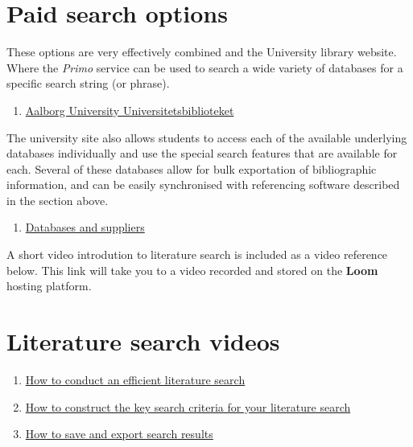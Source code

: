 \documentclass[
]{book}
\providecommand{\tightlist}{%
  \setlength{\itemsep}{0pt}\setlength{\parskip}{0pt}}
\begin{document}
\hypertarget{paid-search-options}{%
\section{Paid search options}\label{paid-search-options}}

These options are very effectively combined and the University library website. Where the \emph{Primo} service can be used to search a wide variety of databases for a specific search string (or phrase).

\begin{enumerate}
\def\labelenumi{\arabic{enumi}.}
\tightlist
\item
  \href{https://www.en.aub.aau.dk}{Aalborg University Universitetsbiblioteket}
\end{enumerate}

The university site also allows students to access each of the available underlying databases individually and use the special search features that are available for each. Several of these databases allow for bulk exportation of bibliographic information, and can be easily synchronised with referencing software described in the section above.

\begin{enumerate}
\def\labelenumi{\arabic{enumi}.}
\setcounter{enumi}{1}
\tightlist
\item
  \href{https://www.en.aub.aau.dk/find-material/databases}{Databases and suppliers}
\end{enumerate}

A short video introdution to literature search is included as a video reference below. This link will take you to a video recorded and stored on the \textbf{Loom} hosting platform.

\hypertarget{literature-search-videos}{%
\section{Literature search videos}\label{literature-search-videos}}

\begin{enumerate}
\def\labelenumi{\arabic{enumi}.}
\item
  \href{}{How to conduct an efficient literature search}
\item
  \href{}{How to construct the key search criteria for your literature search}
\item
  \href{}{How to save and export search results}
\end{enumerate}
\end{document}
